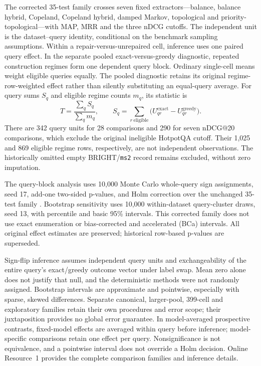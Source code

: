 \documentclass[pdflatex,iicol,sn-basic,Numbered]{sn-jnl}
\begin{document}
The corrected 35-test family crosses seven fixed extractors---balance, balance hybrid, Copeland, Copeland hybrid, damped Markov, topological and priority-topological---with MAP, MRR and the three nDCG cutoffs. The independent unit is the dataset--query identity, conditional on the benchmark sampling assumptions. Within a repair-versus-unrepaired cell, inference uses one paired query effect. In the separate pooled exact-versus-greedy diagnostic, repeated construction regimes form one dependent query block. Ordinary single-cell means weight eligible queries equally. The pooled diagnostic retains its original regime-row-weighted effect rather than silently substituting an equal-query average. For query sums $S_q$ and eligible regime counts $m_q$, its statistic is
\begin{equation}
T=\frac{\sum_q S_q}{\sum_q m_q},\qquad
S_q=\sum_{r\ \mathrm{eligible}}\bigl(U_{qr}^{\mathrm{exact}}-U_{qr}^{\mathrm{greedy}}\bigr).
\label{eq:pooled}
\end{equation}
There are 342 query units for 28 comparisons and 290 for seven nDCG@20 comparisons, which exclude the original ineligible HotpotQA cutoff. Their 1,025 and 869 eligible regime rows, respectively, are not independent observations. The historically omitted empty BRIGHT/\texttt{ms2} record remains excluded, without zero imputation.

The query-block analysis uses 10,000 Monte Carlo whole-query sign assignments, seed 17, add-one two-sided p-values, and Holm correction over the unchanged 35-test family \cite{holm1979simple}. Bootstrap sensitivity uses 10,000 within-dataset query-cluster draws, seed 13, with percentile and basic 95\% intervals. This corrected family does not use exact enumeration or bias-corrected and accelerated (BCa) intervals. All original effect estimates are preserved; historical row-based p-values are superseded.

Sign-flip inference assumes independent query units and exchangeability of the entire query's exact/greedy outcome vector under label swap. Mean zero alone does not justify that null, and the deterministic methods were not randomly assigned. Bootstrap intervals are approximate and pointwise, especially with sparse, skewed differences. Separate canonical, larger-pool, 399-cell and exploratory families retain their own procedures and error scope; their juxtaposition provides no global error guarantee. In model-averaged prospective contrasts, fixed-model effects are averaged within query before inference; model-specific comparisons retain one effect per query. Nonsignificance is not equivalence, and a pointwise interval does not override a Holm decision. Online Resource~1 provides the complete comparison families and inference details.
\end{document}
